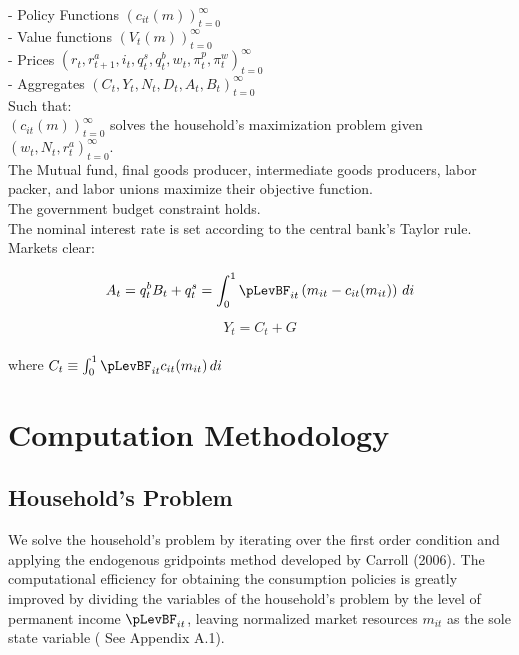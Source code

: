 \documentclass[titlepage]{\econtex}\providecommand{\texname}{BufferStockTheory}
\begin{document}
- Policy Functions $\left( c_{it}(m) \right )_{t=0}^{\infty}$ \\

- Value functions $ \left( V_{t}(m) \right)_{t=0}^{\infty}$\\

- Prices $ \left(r_{t},  r^{a}_{t+1}, i_{t}, q^{s}_{t}, q^{b}_{t}, w_{t} , \pi^{p}_{t}, \pi^{w}_{t} \right) _{t=0}^{\infty}$\\

- Aggregates $ \left(C_{t}, Y_{t} , N_{t}, D_{t} , A_{t} , B_{t} \right)_{t=0}^{\infty}$\\

Such that: \\

$ \left(  c_{it}(m)\right)_{t=0}^{\infty}$  solves the household's maximization problem given $  \left( w_{t}, N_{t},  r^{a}_{t} \right)_{t=0}^{\infty}$.\\

The Mutual fund, final goods producer, intermediate goods producers, labor packer, and labor unions maximize their objective function. \\

The government budget constraint holds. \\

The nominal interest rate is set according to the central bank's Taylor rule. \\


Markets clear:

 $$ A_t = q^{b}_{t} B_{t} + q^{s}_{t} =  \int_{0}^{1} \pLevBF_{it}\left( m_{it} - c_{it}(m_{it})\right) \, di $$
 
 $$ Y_t = C_{t} +G $$ \\
 
 where $C_{t} \equiv  \int_{0}^{1} \pLevBF_{it} c_{it}(m_{it})\, di $ \\


\hypertarget{Computational Methodology}{}
\section{Computation Methodology}

\hypertarget{Household's Problem}{}
\subsection{Household's Problem}

We solve the household's problem by iterating over the first order condition and applying the endogenous gridpoints method developed by Carroll (2006). The computational efficiency for obtaining the consumption policies is greatly improved by dividing the variables of the household's problem by the level of permanent income $\pLevBF_{it}$, leaving normalized market resources $m_{it}$ as the sole state variable ( See Appendix  A.1).  
\end{document}
